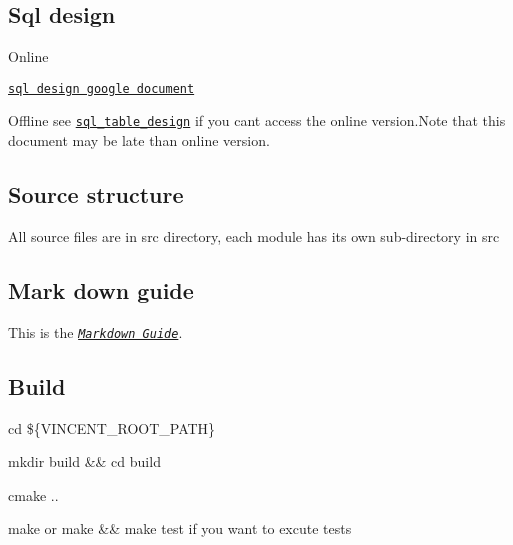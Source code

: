 

\href{https://app.codacy.com/app/maidamai0/vincent?utm_source=github.com&utm_medium=referral&utm_content=advanced-data-processing-company/vincent&utm_campaign=Badge_Grade_Settings}{\tt } \href{https://travis-ci.org/advanced-data-processing-company/vincent}{\tt } \href{https://ci.appveyor.com/project/maidamai0/vincent}{\tt } \href{https://lgtm.com/projects/g/advanced-data-processing-company/vincent/alerts/}{\tt } \href{https://lgtm.com/projects/g/advanced-data-processing-company/vincent/context:javascript}{\tt }

\subsection*{Sql design}


\begin{DoxyItemize}
\item Online

\href{https://docs.google.com/document/d/1QlFliN9hr0bRWUpu1whWGgTl2qbUMroOrxDV7gtdL20/edit}{\tt sql design google document}
\item Offline see \href{https://htmlpreview.github.io/?https://github.com/advanced-data-processing-company/vincent/blob/master/sql_table_design.html}{\tt sql\+\_\+table\+\_\+design} if you can\textquotesingle{}t access the online version.\+Note that this document may be late than online version.
\end{DoxyItemize}

\subsection*{Source structure}

All source files are in {\ttfamily src} directory, each module has its own sub-\/directory in {\ttfamily src}

\subsection*{Mark down guide}

This is the {\itshape \href{https://www.markdownguide.org}{\tt Markdown Guide}}.

\subsection*{Build}


\begin{DoxyEnumerate}
\item {\ttfamily cd \$\{V\+I\+N\+C\+E\+N\+T\+\_\+\+R\+O\+O\+T\+\_\+\+P\+A\+TH\}}
\item {\ttfamily mkdir build \&\& cd build}
\item {\ttfamily cmake ..}
\item {\ttfamily make} or {\ttfamily make \&\& make test} if you want to excute tests
\end{DoxyEnumerate}

